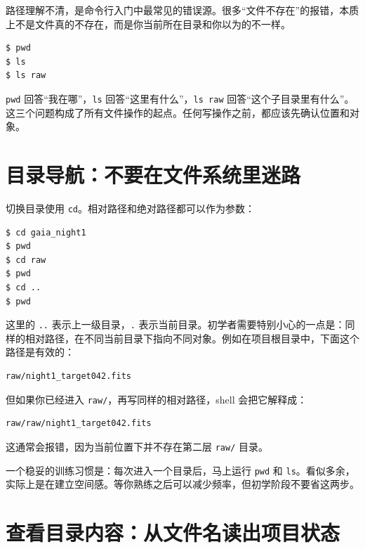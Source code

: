 路径理解不清，是命令行入门中最常见的错误源。很多“文件不存在”的报错，本质上不是文件真的不存在，而是你当前所在目录和你以为的不一样。

\begin{examplebox}[三个定位命令]
\begin{lstlisting}[style=terminal]
$ pwd
$ ls
$ ls raw
\end{lstlisting}
\end{examplebox}

\texttt{pwd} 回答“我在哪”，\texttt{ls} 回答“这里有什么”，\texttt{ls raw} 回答“这个子目录里有什么”。这三个问题构成了所有文件操作的起点。任何写操作之前，都应该先确认位置和对象。

\section{目录导航：不要在文件系统里迷路}

切换目录使用 \texttt{cd}。相对路径和绝对路径都可以作为参数：

\begin{examplebox}[切换目录]
\begin{lstlisting}[style=terminal]
$ cd gaia_night1
$ pwd
$ cd raw
$ pwd
$ cd ..
$ pwd
\end{lstlisting}
\end{examplebox}

这里的 \texttt{..} 表示上一级目录，\texttt{.} 表示当前目录。初学者需要特别小心的一点是：同样的相对路径，在不同当前目录下指向不同对象。例如在项目根目录中，下面这个路径是有效的：

\begin{lstlisting}[style=terminal]
raw/night1_target042.fits
\end{lstlisting}

但如果你已经进入 \texttt{raw/}，再写同样的相对路径，shell 会把它解释成：

\begin{lstlisting}[style=terminal]
raw/raw/night1_target042.fits
\end{lstlisting}

这通常会报错，因为当前位置下并不存在第二层 \texttt{raw/} 目录。

一个稳妥的训练习惯是：每次进入一个目录后，马上运行 \texttt{pwd} 和 \texttt{ls}。看似多余，实际上是在建立空间感。等你熟练之后可以减少频率，但初学阶段不要省这两步。

\section{查看目录内容：从文件名读出项目状态}

